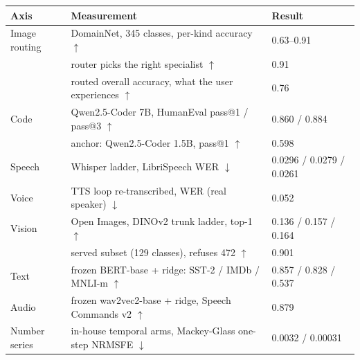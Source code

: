 \documentclass[11pt]{article}
\begin{document}
\begin{center}\small
    \begin{tabular}{@{}l>{\raggedright\arraybackslash}p{7.8cm}l@{}}
        \toprule
        \textbf{Axis} & \textbf{Measurement}                                              & \textbf{Result}                                             \\
        \midrule
        Image routing & DomainNet, 345 classes, per-kind accuracy $\uparrow$              & 0.63--0.91                                                  \\
                      & router picks the right specialist $\uparrow$                      & 0.91                                                        \\
                      & routed overall accuracy, what the user experiences $\uparrow$     & 0.76                                                        \\
        Code          & Qwen2.5-Coder 7B, HumanEval pass@1 / pass@3 $\uparrow$            & 0.860 / 0.884                                               \\
                      & anchor: Qwen2.5-Coder 1.5B, pass@1 $\uparrow$                     & 0.598                                                       \\
        Speech        & Whisper ladder, LibriSpeech WER $\downarrow$                      & 0.0296 / 0.0279 / 0.0261                                    \\
        Voice         & TTS loop re-transcribed, WER (real speaker) $\downarrow$          & 0.052                                                       \\
        Vision        & Open Images, DINOv2 trunk ladder, top-1 $\uparrow$                & 0.136 / 0.157 / 0.164                                       \\
                      & served subset (129 classes), refuses 472 $\uparrow$               & 0.901                                                       \\
        Text          & frozen BERT-base + ridge: SST-2 / IMDb / MNLI-m $\uparrow$        & 0.857 / 0.828 / 0.537                                       \\
        Audio         & frozen wav2vec2-base + ridge, Speech Commands v2 $\uparrow$       & 0.879                                                       \\
        Number series & in-house temporal arms, Mackey-Glass one-step NRMSFE $\downarrow$ & 0.0032 / 0.00031                                            \\

\end{tabular}
\end{center}
\end{document}
